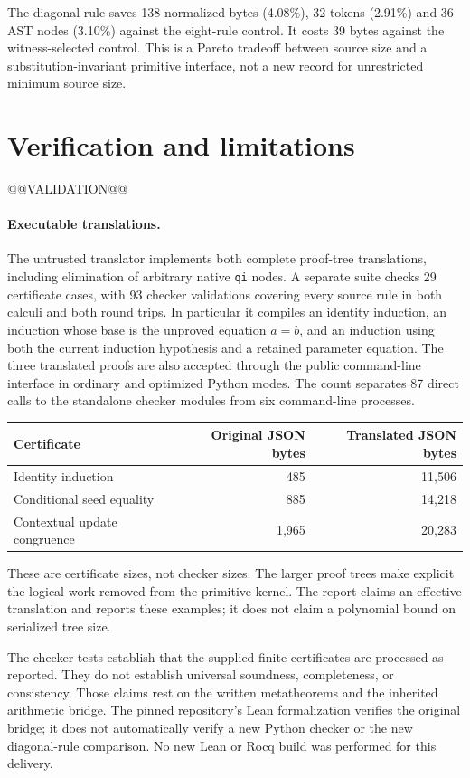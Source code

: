 \documentclass[11pt]{article}
\theoremstyle{definition}
\theoremstyle{remark}
\begin{document}
The diagonal rule saves 138 normalized bytes (4.08\%), 32 tokens
(2.91\%) and 36 AST nodes (3.10\%) against the eight-rule control.
It costs 39 bytes against the witness-selected control. This is a
Pareto tradeoff between source size and a substitution-invariant primitive
interface, not a new record for unrestricted minimum source size.

\section{Verification and limitations}
\label{sec:validation}

@@VALIDATION@@

\paragraph{Executable translations.}
The untrusted translator implements both complete proof-tree translations,
including elimination of arbitrary native \texttt{qi} nodes. A separate
suite checks 29 certificate cases, with 93 checker validations covering
every source rule in both calculi and both round trips. In particular it
compiles an identity induction, an induction whose base is the unproved
equation \(a=b\), and an induction using both the current induction
hypothesis and a retained parameter equation. The three translated
proofs are also accepted through the public command-line interface in
ordinary and optimized Python modes. The count separates 87 direct calls
to the standalone checker modules from six command-line processes.

\begin{center}\small
\begin{tabular}{@{}lrr@{}}
\toprule
Certificate & Original JSON bytes & Translated JSON bytes\\
\midrule
Identity induction & 485 & 11,506\\
Conditional seed equality & 885 & 14,218\\
Contextual update congruence & 1,965 & 20,283\\
\bottomrule
\end{tabular}
\end{center}
These are certificate sizes, not checker sizes. The larger proof trees
make explicit the logical work removed from the primitive kernel. The
report claims an effective translation and reports these examples; it
does not claim a polynomial bound on serialized tree size.

The checker tests establish that the supplied finite certificates are
processed as reported. They do not establish universal soundness,
completeness, or consistency. Those claims rest on the written
metatheorems and the inherited arithmetic bridge. The pinned repository's
Lean formalization verifies the original bridge; it does not automatically
verify a new Python checker or the new diagonal-rule comparison.
No new Lean or Rocq build was performed for this delivery.
\end{document}
